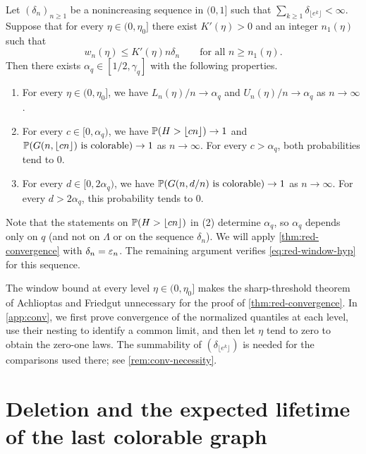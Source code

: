 \begin{theorem}\label{thm:red-convergence}
Let $(\delta_n)_{n \ge 1}$ be a nonincreasing sequence in $(0, 1]$ such that $\sum_{k \ge 1} \delta_{\lfloor e^k \rfloor} < \infty$. Suppose that for every $\eta \in (0, \eta_0]$ there exist $K'(\eta) > 0$ and an integer $n_1(\eta)$ such that
\begin{equation}\label{eq:red-window-hyp}
w_n(\eta) \le K'(\eta) n \delta_n \qquad \text{for all } n \ge n_1(\eta).
\end{equation}
Then there exists $\alpha_q \in [1/2, \gamma_q]$ with the following properties.
\begin{enumerate}[label=(\arabic*)]
\item For every $\eta \in (0, \eta_0]$, we have $L_n(\eta)/n \to \alpha_q$ and $U_n(\eta)/n \to \alpha_q$ as $n \to \infty$.
\item For every $c \in [0, \alpha_q)$, we have $\mathbb P(H > \lfloor cn \rfloor) \to 1$ and $\mathbb P(G(n, \lfloor cn \rfloor) \text{ is colorable}) \to 1$ as $n \to \infty$. For every $c > \alpha_q$, both probabilities tend to $0$.
\item For every $d \in [0, 2 \alpha_q)$, we have $\mathbb P(G(n, d/n) \text{ is colorable}) \to 1$ as $n \to \infty$. For every $d > 2 \alpha_q$, this probability tends to $0$.
\end{enumerate}
\end{theorem}

Note that the statements on $\mathbb P(H > \lfloor cn \rfloor)$ in (2) determine $\alpha_q$, so $\alpha_q$ depends only on $q$ (and not on $\Lambda$ or on the sequence $\delta_n$). We will apply \cref{thm:red-convergence} with $\delta_n = \varepsilon_n$. The remaining argument verifies \eqref{eq:red-window-hyp} for this sequence.

\begin{remark}\label{rem:red-af}
The window bound at every level $\eta \in (0, \eta_0]$ makes the sharp-threshold theorem of Achlioptas and Friedgut \cite[Theorem~1.1]{achlioptas1999sharp} unnecessary for the proof of \cref{thm:red-convergence}. In \cref{app:conv}, we first prove convergence of the normalized quantiles at each level, use their nesting to identify a common limit, and then let $\eta$ tend to zero to obtain the zero-one laws. The summability of $(\delta_{\lfloor e^k \rfloor})$ is needed for the comparisons used there; see \cref{rem:conv-necessity}.
\end{remark}

\section{Deletion and the expected lifetime of the last colorable graph}\label{sec:red-deletion}

